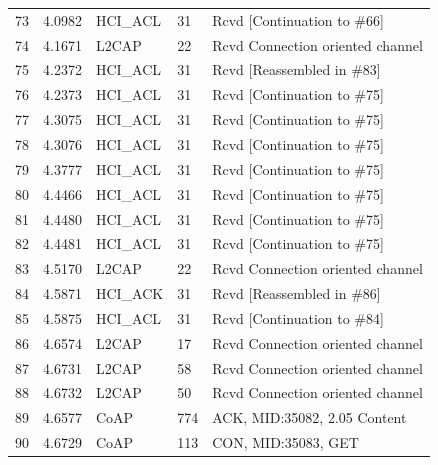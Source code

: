 \begin{table}[H]
\begin{tabular}{lllll}
73     & 4.0982  & HCI\_ACL & 31     & Rcvd {[}Continuation to \#66{]}  \\
74     & 4.1671  & L2CAP    & 22     & Rcvd Connection oriented channel \\
75     & 4.2372  & HCI\_ACL & 31     & Rcvd {[}Reassembled in \#83{]}   \\
76     & 4.2373  & HCI\_ACL & 31     & Rcvd {[}Continuation to \#75{]}  \\
77     & 4.3075  & HCI\_ACL & 31     & Rcvd {[}Continuation to \#75{]}  \\
78     & 4.3076  & HCI\_ACL & 31     & Rcvd {[}Continuation to \#75{]}  \\
79     & 4.3777  & HCI\_ACL & 31     & Rcvd {[}Continuation to \#75{]}  \\
80     & 4.4466  & HCI\_ACL & 31     & Rcvd {[}Continuation to \#75{]}  \\
81     & 4.4480  & HCI\_ACL & 31     & Rcvd {[}Continuation to \#75{]}  \\
82     & 4.4481  & HCI\_ACL & 31     & Rcvd {[}Continuation to \#75{]}  \\
83     & 4.5170  & L2CAP    & 22     & Rcvd Connection oriented channel \\
84     & 4.5871  & HCI\_ACK & 31     & Rcvd {[}Reassembled in \#86{]}   \\
85     & 4.5875  & HCI\_ACL & 31     & Rcvd {[}Continuation to \#84{]}  \\
86     & 4.6574  & L2CAP    & 17     & Rcvd Connection oriented channel \\
87     & 4.6731  & L2CAP    & 58     & Rcvd Connection oriented channel \\
88     & 4.6732  & L2CAP    & 50     & Rcvd Connection oriented channel \\
89     & 4.6577  & CoAP     & 774    & ACK, MID:35082, 2.05 Content     \\
90     & 4.6729  & CoAP     & 113    & CON, MID:35083, GET              \\ \hline
\end{tabular}
\end{table}

\newpage

